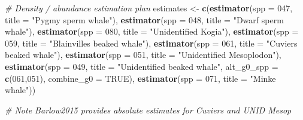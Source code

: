 \documentclass[
]{book}
\newenvironment{Shaded}{\begin{snugshade}}{\end{snugshade}}
\newcommand{\AttributeTok}[1]{\textcolor[rgb]{0.13,0.29,0.53}{#1}}
\newcommand{\CommentTok}[1]{\textcolor[rgb]{0.56,0.35,0.01}{\textit{#1}}}
\newcommand{\ConstantTok}[1]{\textcolor[rgb]{0.56,0.35,0.01}{#1}}
\newcommand{\FunctionTok}[1]{\textcolor[rgb]{0.13,0.29,0.53}{\textbf{#1}}}
\newcommand{\NormalTok}[1]{#1}
\newcommand{\OtherTok}[1]{\textcolor[rgb]{0.56,0.35,0.01}{#1}}
\newcommand{\StringTok}[1]{\textcolor[rgb]{0.31,0.60,0.02}{#1}}
\begin{document}
\begin{Shaded}
\begin{Highlighting}[]
  \CommentTok{\# Density / abundance estimation plan}
\NormalTok{  estimates }\OtherTok{\textless{}{-}}
      \FunctionTok{c}\NormalTok{(}\FunctionTok{estimator}\NormalTok{(}\AttributeTok{spp =} \StringTok{\textquotesingle{}047\textquotesingle{}}\NormalTok{, }\AttributeTok{title =} \StringTok{"Pygmy sperm whale"}\NormalTok{),}
        \FunctionTok{estimator}\NormalTok{(}\AttributeTok{spp =} \StringTok{\textquotesingle{}048\textquotesingle{}}\NormalTok{, }\AttributeTok{title =} \StringTok{"Dwarf sperm whale"}\NormalTok{),}
        \FunctionTok{estimator}\NormalTok{(}\AttributeTok{spp =} \StringTok{\textquotesingle{}080\textquotesingle{}}\NormalTok{, }\AttributeTok{title =} \StringTok{"Unidentified Kogia"}\NormalTok{),}
        \FunctionTok{estimator}\NormalTok{(}\AttributeTok{spp =} \StringTok{\textquotesingle{}059\textquotesingle{}}\NormalTok{, }\AttributeTok{title =} \StringTok{"Blainville\textquotesingle{}s beaked whale"}\NormalTok{),}
        \FunctionTok{estimator}\NormalTok{(}\AttributeTok{spp =} \StringTok{\textquotesingle{}061\textquotesingle{}}\NormalTok{, }\AttributeTok{title =} \StringTok{"Cuvier\textquotesingle{}s beaked whale"}\NormalTok{),}
        \FunctionTok{estimator}\NormalTok{(}\AttributeTok{spp =} \StringTok{\textquotesingle{}051\textquotesingle{}}\NormalTok{, }\AttributeTok{title =} \StringTok{"Unidentified Mesoplodon"}\NormalTok{),}
        \FunctionTok{estimator}\NormalTok{(}\AttributeTok{spp =} \StringTok{\textquotesingle{}049\textquotesingle{}}\NormalTok{, }
                  \AttributeTok{title =} \StringTok{"Unidentified beaked whale"}\NormalTok{,}
                  \AttributeTok{alt\_g0\_spp =} \FunctionTok{c}\NormalTok{(}\StringTok{\textquotesingle{}061\textquotesingle{}}\NormalTok{,}\StringTok{\textquotesingle{}051\textquotesingle{}}\NormalTok{),}
                  \AttributeTok{combine\_g0 =} \ConstantTok{TRUE}\NormalTok{),}
        \FunctionTok{estimator}\NormalTok{(}\AttributeTok{spp =} \StringTok{\textquotesingle{}071\textquotesingle{}}\NormalTok{, }\AttributeTok{title =} \StringTok{"Minke whale"}\NormalTok{))}

  \CommentTok{\# Note Barlow2015 provides absolute estimates for Cuviers and UNID Mesop}
  

\end{Highlighting}
\end{Shaded}
\end{document}
